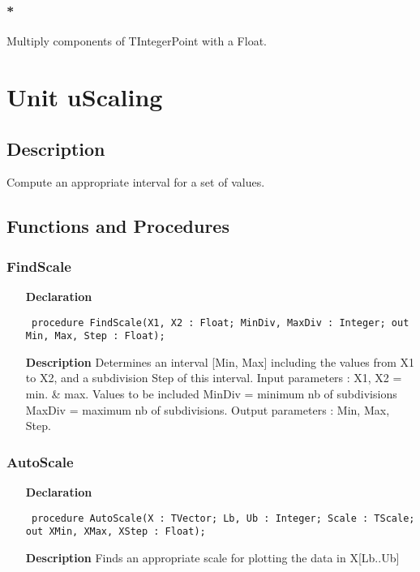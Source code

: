 \documentclass[12pt,a4paper,oneside]{report}
\newcommand{\declarationitem}[1]{\textbf{#1}}
\newcommand{\descriptiontitle}[1]{\textbf{#1}}
\newcommand{\code}[1]{\texttt{#1}}
\begin{document}
\subsubsection{*}
Multiply components of TIntegerPoint with a Float. 
\section{Unit uScaling}
\label{uScaling}
\subsection{Description}
Compute an appropriate interval for a set of values. 
\subsection{Functions and Procedures}
\subsubsection{FindScale}
\label{uScaling-FindScale}
\begin{itemize}\item[\declarationitem{Declaration}\hfill]
\begin{flushleft}
\code{
procedure FindScale(X1, X2 : Float; MinDiv, MaxDiv : Integer; out Min, Max, Step : Float);}

\end{flushleft}

\par
\item[\descriptiontitle{Description}]
Determines an interval [Min, Max] including the values from X1 to X2, and a subdivision Step of this interval. Input parameters : X1, X2 = min. {\&} max. Values to be included MinDiv = minimum nb of subdivisions MaxDiv = maximum nb of subdivisions. Output parameters : Min, Max, Step.

\end{itemize}
\subsubsection{AutoScale}
\label{uScaling-AutoScale}
\begin{itemize}\item[\declarationitem{Declaration}\hfill]
\begin{flushleft}
\code{
procedure AutoScale(X : TVector; Lb, Ub : Integer; Scale : TScale; out XMin, XMax, XStep : Float);}
\end{flushleft}
\par
\item[\descriptiontitle{Description}]
Finds an appropriate scale for plotting the data in X[Lb..Ub]
\end{itemize}
\end{document}
